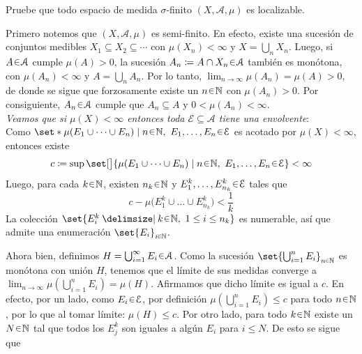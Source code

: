 \setcounter{neje}{57}
\begin{nejer}
Pruebe que todo espacio de medida $\sigma$-finito $(X, \mathcal{A}, \mu)$ es localizable.
\end{nejer}
\begin{sol}
Primero notemos que $(X, \mathcal{A}, \mu)$ es semi-finito. En efecto, existe una sucesión de conjuntos medibles $X_1 \subseteq X_2\subseteq \cdots$ con $\mu(X_n) < \infty$ y $X = \bigcup_nX_n$. Luego, si $A\en\mathcal{A}$ cumple $\mu(A)>0$, la sucesión $A_n \coloneq A \cap X_n \en \mathcal{A}$ también es monótona, con $\mu(A_n) < \infty$ y $A = \bigcup_nA_n$. Por lo tanto, $\lim_{n\to\infty} \mu(A_n) = \mu(A) >0$, de donde se sigue que forzosamente existe un $n\en\mathbb{N}$ con $\mu(A_n) >0$. Por consiguiente, $A_n\en\mathcal{A}$ cumple que $A_n \subseteq A$ y $0 < \mu(A_n) < \infty$.\vspace{1em}\\
\emph{Veamos que si $\mu(X) < \infty$ entonces toda $\mathcal{E} \subseteq \mathcal{A}$ tiene una envolvente}:\\
Como $\set*{\mu(E_1 \cup \dots \cup E_n) \mid n \en \mathbb{N},\ E_1, \dots, E_n \en \mathcal{E}}$ es acotado por $\mu(X) < \infty$, entonces existe 
\[
c \coloneq \sup\set[\big]{\mu(E_1 \cup \dots \cup E_n) \mid n \en \mathbb{N},\ E_1, \dots, E_n \en \mathcal{E}} < \infty
\]
Luego, para cada $k\en\mathbb{N}$, existen $n_k\en\mathbb{N}$ y $E^k_1,\dots,E^k_{n_k} \en \mathcal{E}$ tales que
\[
c - \mu\bigl(E^k_1\cup\dots\cup E^k_{n_k}\bigr) < \frac{1}{k}
\]
La colección $\set{E^k_i \given k\en\mathbb{N},\ 1\le i \le n_k}$ es numerable, así que admite una enumeración $\set{E_i}_{i\en\mathbb{N}}$.\par 
Ahora bien, definimos $H = \bigcup^\infty_{i=1}E_i\en\mathcal{A}$. Como la sucesión $\set{\bigcup^n_{i=1} E_i}_{n\en\mathbb{N}}$ es monótona con unión $H$, tenemos que el límite de sus medidas converge a $\lim_{n\to\infty} \mu(\bigcup^n_{i=1}E_i) = \mu(H)$. Afirmamos que dicho límite es igual a $c$. En efecto, por un lado, como $E_i \en \mathcal{E}$, por definición $\mu(\bigcup^n_{i=1}E_i) \leq c$ para todo $n\en\mathbb{N}$, por lo que al tomar límite: $\mu(H) \le c$. Por otro lado, para todo $k\en\mathbb{N}$ existe un $N\en\mathbb{N}$ tal que todos los $E^k_j$ son iguales a algún $E_i$ para $i \leq N$. De esto se sigue que

\end{sol}

